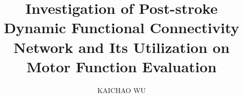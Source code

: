 \documentclass[a4paper,12pt,twoside]{report}
\numberwithin{equation}{chapter}%
\numberwithin{figure}{chapter}
\begin{document}
 \title{\LARGE {\bf  Investigation of Post-stroke Dynamic Functional Connectivity Network and Its Utilization on Motor Function Evaluation}\\
 	\vspace*{6mm}
 }
 \author{KAICHAO WU}

 \normallinespacing
 \maketitle

 
 \let\cleardoublepage\clearpage
 
 


\body

\pagestyle{uheadings}

% 
% 

% 
%
% 

\appendix

\begin{appendices}

% 
% 
% 

\end{appendices}



\end{document}

